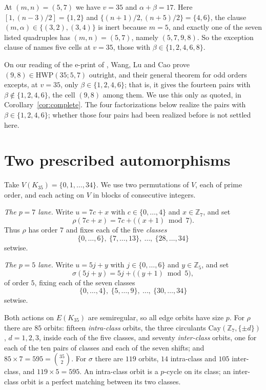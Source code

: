 \documentclass[11pt]{amsart}
\newcommand{\HWP}{\mathrm{HWP}}
\begin{document}
At $(m,n)=(5,7)$ we have $v=35$ and $\alpha+\beta=17$. Here
$[1,(n-3)/2]=\{1,2\}$ and $\{(n+1)/2,(n+5)/2\}=\{4,6\}$, the clause
$(m,\alpha)\in\{(3,2),(3,4)\}$ is inert because $m=5$, and exactly one
of the seven listed quadruples has $(m,n)=(5,7)$, namely
$(5,7,9,8)$. So the exception clause of \cite{BDT17} names five cells at
$v=35$, those with $\beta\in\{1,2,4,6,8\}$.

On our reading of the e-print of \cite{WLC}, Wang, Lu and Cao prove
$(9,8)\in\HWP(35;5,7)$ outright, and their general theorem for odd
orders excepts, at $v=35$, only $\beta\in\{1,2,4,6\}$; that is, it
gives the fourteen pairs with $\beta\notin\{1,2,4,6\}$, the cell
$(9,8)$ among them. We use this only as quoted, in
Corollary~\ref{cor:complete}. The four factorizations below realize the
pairs with $\beta\in\{1,2,4,6\}$; whether those four pairs had been
realized before is not settled here.

\section{Two prescribed automorphisms}

Take $V(K_{35})=\{0,1,\dots,34\}$. We use two permutations of $V$, each
of prime order, and each acting on $V$ in blocks of consecutive
integers.

\emph{The $p=7$ lane.} Write $u=7c+x$ with $c\in\{0,\dots,4\}$ and
$x\in\mathbb{Z}_7$, and set
\[
  \rho(7c+x)=7c+\bigl((x+1)\bmod 7\bigr).
\]
Thus $\rho$ has order $7$ and fixes each of the five \emph{classes}
\[
  \{0,\dots,6\},\ \{7,\dots,13\},\ \dots,\ \{28,\dots,34\}
\]
setwise.

\emph{The $p=5$ lane.} Write $u=5j+y$ with $j\in\{0,\dots,6\}$ and
$y\in\mathbb{Z}_5$, and set
\[
  \sigma(5j+y)=5j+\bigl((y+1)\bmod 5\bigr),
\]
of order $5$, fixing each of the seven classes
\[
  \{0,\dots,4\},\ \{5,\dots,9\},\ \dots,\ \{30,\dots,34\}
\]
setwise.

Both actions on $E(K_{35})$ are semiregular, so all edge orbits have
size $p$. For $\rho$ there are $85$ orbits: fifteen \emph{intra-class}
orbits, the three circulants $\mathrm{Cay}(\mathbb{Z}_7,\{\pm d\})$,
$d=1,2,3$, inside each of the five classes, and seventy
\emph{inter-class} orbits, one for each of the ten pairs of classes and
each of the seven shifts; and $85\times7=595=\binom{35}{2}$. For
$\sigma$ there are $119$ orbits, $14$ intra-class and $105$
inter-class, and $119\times5=595$. An intra-class orbit is a $p$-cycle
on its class; an inter-class orbit is a perfect matching between its
two classes.
\end{document}
